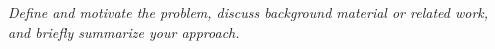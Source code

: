 \textit{Define and motivate the problem, discuss background material or related work, and briefly summarize your approach.}
